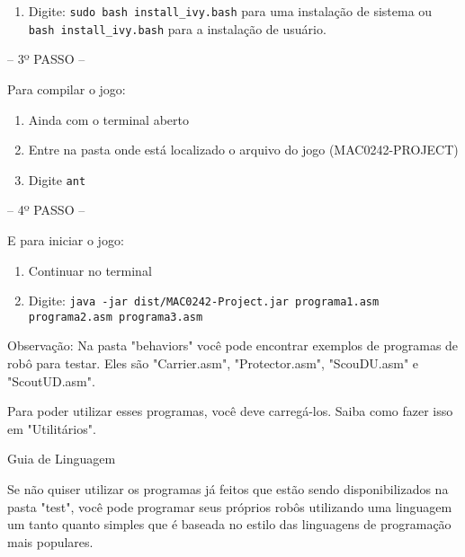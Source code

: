 \documentclass[a4paper]{article}
\begin{document}
{{{\begin{enumerate}
    \item Digite: \texttt{sudo bash install\_ivy.bash} para uma instalação
          de sistema ou \texttt{bash install\_ivy.bash} para a
          instalação de usuário.
    
\end{enumerate}

\bigskip


\textcolor{NavyBlue}{-- 3º PASSO --}

Para compilar o jogo:

\begin{enumerate}
    \item Ainda com o terminal aberto

    \item Entre na pasta onde está localizado o arquivo do jogo (MAC0242-PROJECT)

    \item Digite \texttt{ant}
\end{enumerate}

\bigskip



\textcolor{NavyBlue}{-- 4º PASSO --}

E para iniciar o jogo: 

\begin{enumerate}                                            
    \item Continuar no terminal
 	\item Digite: \texttt{java -jar dist/MAC0242-Project.jar
          programa1.asm programa2.asm programa3.asm}
\end{enumerate}

Observação: Na pasta "behaviors" você pode encontrar exemplos de 
programas de robô para testar.
Eles são "Carrier.asm", "Protector.asm", "ScouDU.asm" e "ScoutUD.asm".

Para poder utilizar esses programas, você deve carregá-los. Saiba 
como fazer isso em "Utilitários".

\bigskip


\newpage %



\newpage %



{\textcolor{NavyBlue}{\LARGE Guia de Linguagem}

    \bigskip
    \bigskip
    
    Se não quiser utilizar os programas já feitos
    que estão sendo disponibilizados na pasta "test",
    você pode programar seus próprios robôs utilizando
    uma linguagem um tanto quanto simples que é baseada
    no estilo das linguagens de programação mais 
    populares. 
    
}}}}
\end{document}

